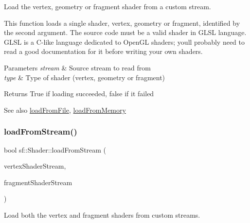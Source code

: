 Load the vertex, geometry or fragment shader from a custom stream. 

This function loads a single shader, vertex, geometry or fragment, identified by the second argument. The source code must be a valid shader in G\+L\+SL language. G\+L\+SL is a C-\/like language dedicated to Open\+GL shaders; you\textquotesingle{}ll probably need to read a good documentation for it before writing your own shaders.


\begin{DoxyParams}{Parameters}
{\em stream} & Source stream to read from \\
\hline
{\em type} & Type of shader (vertex, geometry or fragment)\\
\hline
\end{DoxyParams}
\begin{DoxyReturn}{Returns}
True if loading succeeded, false if it failed
\end{DoxyReturn}
\begin{DoxySeeAlso}{See also}
\mbox{\hyperlink{classsf_1_1_shader_a053a5632848ebaca2fcd8ba29abe9e6e}{load\+From\+File}}, \mbox{\hyperlink{classsf_1_1_shader_ac92d46bf71dff2d791117e4e472148aa}{load\+From\+Memory}} \begin{DoxyVerb}\end{DoxyVerb}
 
\end{DoxySeeAlso}
\mbox{\label{classsf_1_1_shader_a3b7958159ffb5596c4babc3052e35465}} 
\subsubsection{\texorpdfstring{loadFromStream()}{loadFromStream()}\hspace{0.1cm}{\footnotesize\ttfamily [2/3]}}
{\footnotesize\ttfamily bool sf\+::\+Shader\+::load\+From\+Stream (\begin{DoxyParamCaption}\item[{\mbox{\hyperlink{classsf_1_1_input_stream}{Input\+Stream}} \&}]{vertex\+Shader\+Stream,  }\item[{\mbox{\hyperlink{classsf_1_1_input_stream}{Input\+Stream}} \&}]{fragment\+Shader\+Stream }\end{DoxyParamCaption})}



Load both the vertex and fragment shaders from custom streams. 

